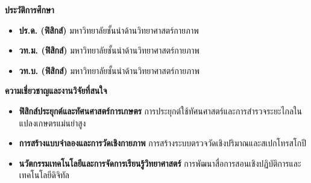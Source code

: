 \noindent
\begin{minipage}[t]{0.48\textwidth}
    {\fontsize{12}{15}\selectfont\bfseries\color{rbruNavy}ประวัติการศึกษา}\par
    \vspace{4pt}
    \begin{itemize}[leftmargin=1.1em, itemsep=2pt]
        \item \textbf{ปร.ด. (ฟิสิกส์)}\newline
        มหาวิทยาลัยชั้นนำด้านวิทยาศาสตร์กายภาพ
        \item \textbf{วท.ม. (ฟิสิกส์)}\newline
        มหาวิทยาลัยชั้นนำด้านวิทยาศาสตร์กายภาพ
        \item \textbf{วท.บ. (ฟิสิกส์)}\newline
        มหาวิทยาลัยชั้นนำด้านวิทยาศาสตร์กายภาพ
    \end{itemize}
\end{minipage}
\hfill
\begin{minipage}[t]{0.48\textwidth}
    {\fontsize{12}{15}\selectfont\bfseries\color{rbruNavy}ความเชี่ยวชาญและงานวิจัยที่สนใจ}\par
    \vspace{4pt}
    \begin{itemize}[leftmargin=1.1em, itemsep=2pt]
        \item \textbf{ฟิสิกส์ประยุกต์และทัศนศาสตร์การเกษตร}\newline
        การประยุกต์ใช้ทัศนศาสตร์และการสำรวจระยะไกลในแปลงเกษตรแม่นยำสูง
        \item \textbf{การสร้างแบบจำลองและการวัดเชิงกายภาพ}\newline
        การสร้างระบบตรวจวัดเชิงปริมาณและสเปกโทรสโกปี
        \item \textbf{นวัตกรรมเทคโนโลยีและการจัดการเรียนรู้วิทยาศาสตร์}\newline
        การพัฒนาสื่อการสอนเชิงปฏิบัติการและเทคโนโลยีดิจิทัล
    \end{itemize}
\end{minipage}

\clearpage
